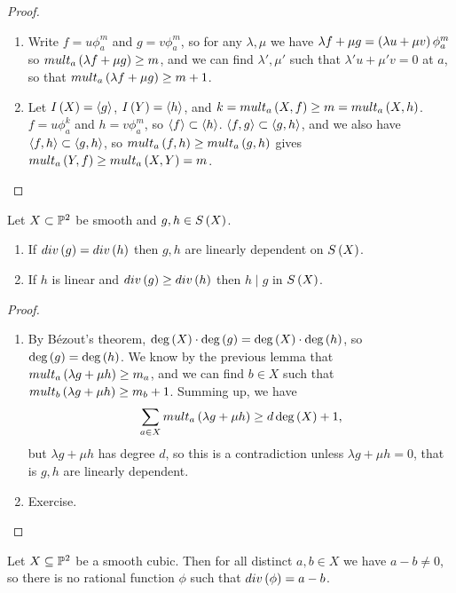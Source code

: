 \begin{proof}
\hfill
\begin{enumerate}
\item Write $ f = u\phi_a^m $ and $ g = v\phi_a^m $, so for any $ \lambda, \mu $ we have $ \lambda f + \mu g = \br{\lambda u + \mu v}\phi_a^m $ so $ mult_a\br{\lambda f + \mu g} \ge m $, and we can find $ \lambda', \mu' $ such that $ \lambda'u + \mu'v = 0 $ at $ a $, so that $ mult_a\br{\lambda f + \mu g} \ge m + 1 $.
\item Let $ I\br{X} = \abr{g} $, $ I\br{Y} = \abr{h} $, and $ k = mult_a\br{X, f} \ge m = mult_a\br{X, h} $. $ f = u\phi_a^k $ and $ h = v\phi_a^m $, so $ \abr{f} \subset \abr{h} $. $ \abr{f, g} \subset \abr{g, h} $, and we also have $ \abr{f, h} \subset \abr{g, h} $, so $ mult_a\br{f, h} \ge mult_a\br{g, h} $ gives $ mult_a\br{Y, f} \ge mult_a\br{X, Y} = m $.
\end{enumerate}
\end{proof}

\pagebreak

\begin{lemma}
Let $ X \subset \P^2 $ be smooth and $ g, h \in S\br{X} $.
\begin{enumerate}
\item If $ div\br{g} = div\br{h} $ then $ g, h $ are linearly dependent on $ S\br{X} $.
\item If $ h $ is linear and $ div\br{g} \ge div\br{h} $ then $ h \mid g $ in $ S\br{X} $.
\end{enumerate}
\end{lemma}

\begin{proof}
\hfill
\begin{enumerate}
\item By B\'ezout's theorem, $ \deg\br{X} \cdot \deg\br{g} = \deg\br{X} \cdot \deg\br{h} $, so $ \deg\br{g} = \deg\br{h} $. We know by the previous lemma that $ mult_a\br{\lambda g + \mu h} \ge m_a $, and we can find $ b \in X $ such that $ mult_b\br{\lambda g + \mu h} \ge m_b + 1 $. Summing up, we have
$$ \sum_{a \in X} mult_a\br{\lambda g + \mu h} \ge d\deg\br{X} + 1, $$
but $ \lambda g + \mu h $ has degree $ d $, so this is a contradiction unless $ \lambda g + \mu h = 0 $, that is $ g, h $ are linearly dependent.
\item Exercise.
\end{enumerate}
\end{proof}

\begin{proposition}
Let $ X \subseteq \P^2 $ be a smooth cubic. Then for all distinct $ a, b \in X $ we have $ a - b \ne 0 $, so there is no rational function $ \phi $ such that $ div\br{\phi} = a - b $.
\end{proposition}

